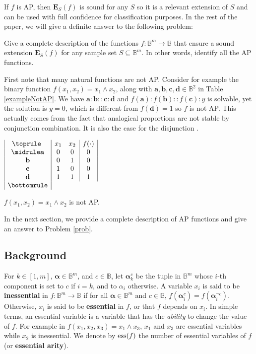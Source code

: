 If $f$ is AP, then $\mathbf{E}_S(f)$ is sound for any $S$ so it is a relevant
extension of $S$ and can be used with full confidence for classification
purposes. In the rest of the paper, we will give a definite answer to the
following problem:

\begin{problem}\label{prob}
  Give a complete description of the functions $f\colon \mathbb{B}^m\to
  \mathbb{B}$ that ensure a sound extension $\mathbf{E}_S(f)$ for any sample
  set $S\subseteq \mathbb{B}^m$. In other words, identify all the AP
  functions.
\end{problem}

First note that many natural functions are not AP. Consider for example the
binary function $f(x_1,x_2)= x_1 \wedge x_2$, along with $\mathbf{a},
\mathbf{b}, \mathbf{c}, \mathbf{d} \in \mathbb{B}^2$ in Table
\ref{exampleNotAP}.  We have $\mathbf{a} : \mathbf{b} :: \mathbf{c} :
\mathbf{d}$ and $f(\mathbf{a}) : f(\mathbf{b}) :: f(\mathbf{c}) : y$ is
solvable, yet the solution is $y=0$, which  is different from $f(\mathbf{d})=1$
so $f$ is not AP. This actually comes from the fact that analogical proportions
are not stable by conjunction combination. It is also the case for the
disjunction \cite{PraRic14}.

\begin{table}[ht]
$\begin{array}{|c|cc|c|}
  \toprule
  ~ & x_1 & x_2 & f(\cdot) \\
  \midrule
  \mathbf{a} & 0 & 0 & 0\\
  \mathbf{b} & 0 & 1 & 0\\
  \mathbf{c} & 1 & 0 & 0\\
  \mathbf{d} & 1 & 1 & 1\\
  \bottomrule
\end{array}
$\bigskip
\caption{$f(x_1,x_2)= x_1 \wedge x_2$ is not AP.}
\label{exampleNotAP}
\end{table}

In the next section, we provide a complete description of AP functions and give
an answer to Problem \ref{prob}.


\subsection{Background}

For $k\in [1,m]$, $\boldsymbol{\alpha}\in \mathbb{B}^m$, and $c \in
\mathbb{B}$, let ${\boldsymbol{\alpha}}_{k}^c$ be the tuple in $\mathbb{B}^{m}$
whose $i$-th component is set to $c$ if $i=k$, and to $\alpha_i$ otherwise.  A
variable $x_i$ is said to be \textbf{inessential} in $f\colon \mathbb{B}^m\to
\mathbb{B}$ if for all $\boldsymbol{\alpha} \in \mathbb{B}^m$ and $c \in
\mathbb{B}$, $f(\boldsymbol{\alpha}^c_i) = f(\boldsymbol{\alpha}^{\neg c}_i)$.
Otherwise, $x_i$ is said to be \textbf{essential} in $f$, or that $f$ depends
on $x_i$. In simple terms, an
essential variable is a variable that has the \textit{ability} to change the
value of $f$. For example in $f(x_1, x_2, x_3) = x_1 \wedge x_3$, $x_1$ and
$x_3$ are essential variables while $x_2$ is inessential.  We denote by
$\operatorname{ess}(f)$ the number of essential variables of $f$ (or \textbf{essential
arity}).

